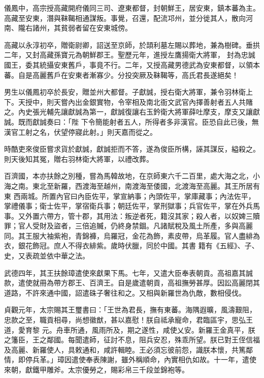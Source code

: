 \begin{pinyinscope}
 儀鳳中，高宗授高藏開府儀同三司、遼東都督，封朝鮮王，居安東，鎮本蕃為主。高藏至安東，潛與靺鞨相通謀叛。事覺，召還，配流邛州，並分徙其人，散向河南、隴右諸州，其貧弱者留在安東城傍。



 高藏以永淳初卒，贈衛尉卿，詔送至京師，於頡利墓左賜以葬地，兼為樹碑。垂拱二年，又封高藏孫寶元為朝鮮郡王。聖歷元年，進授左鷹揚衛大將軍，
 封為忠誠國王，委其統攝安東舊戶，事竟不行。二年，又授高藏男德武為安東都督，以領本蕃。自是高麗舊戶在安東者漸寡少。分投突厥及靺鞨等，高氏君長遂絕矣！



 男生以儀鳳初卒於長安，贈並州大都督。子獻誠，授右衛大將軍，兼令羽林衛上下。天授中，則天嘗內出金銀實物，令宰相及南北衙文武官內擇善射者五人共賭之。內史張光輔先讓獻誠為第一，獻誠復讓右玉鈐衛大將軍薛吐摩支，摩支又讓獻誠。既而獻誠奏曰：「陛
 下令簡能射者五人，所得者多非漢官。臣恐自此已後，無漢官工射之名，伏望停寢此射。」則天嘉而從之。



 時酷吏來俊臣嘗求貨於獻誠，獻誠拒而不答，遂為俊臣所構，誣其謀反，縊殺之。則天後知其冤，贈右羽林衛大將軍，以禮改葬。



 百濟國，本亦扶餘之別種，嘗為馬韓故地，在京師東六千二百里，處大海之北，小海之南。東北至新羅，西渡海至越州，南渡海至倭國，北渡海至高麗。其王所居有東
 西兩城。所置內官曰內臣佐平，掌宣納事；內頭佐平，掌庫藏事；內法佐平，掌禮儀事；衛士佐平，掌宿衛兵事；朝廷佐平，掌刑獄事；兵官佐平，掌在外兵馬事。又外置六帶方，管十郡，其用法：叛逆者死，籍沒其家；殺人者，以奴婢三贖罪；官人受財及盜者，三倍追贓，仍終身禁錮。凡諸賦稅及風土所產，多與高麗同。其王服大袖紫袍，青錦褲，烏羅冠，金花為飾，素皮帶，烏革履。官人盡緋為衣，銀花飾冠。庶人不得衣緋紫。歲時伏臘，同於中國。其書
 籍有《五經》、子、史，又表疏並依中華之法。



 武德四年，其王扶餘璋遣使來獻果下馬。七年，又遣大臣奉表朝貢。高祖嘉其誠款，遣使就冊為帶方郡王、百濟王。自是歲遣朝貢，高祖撫勞甚厚。因訟高麗閉其道路，不許來通中國，詔遣硃子奢往和之。又相與新羅世為仇敵，數相侵伐。



 貞觀元年，太宗賜其王璽書曰：「王世為君長，撫有東蕃。海隅遐曠，風濤艱阻，忠款之至，職貢相尋，尚想徽猷，甚以嘉慰！朕自祗承寵命，君臨區宇，思弘王道，愛育黎
 元。舟車所通，風雨所及，期之遂性，咸使乂安。新羅王金真平，朕之籓臣，王之鄰國。每聞遣師，征討不息，阻兵安忍，殊乖所望。朕已對王侄信福及高麗、新羅使人，具敕通和，咸許輯睦。王必須忘彼前怨，識朕本懷，共篤鄰情，即停兵革。」璋因遣使奉表陳謝，雖外稱順命，內實相仇如故。十一年，遣使來朝，獻鐵甲雕斧。太宗優勞之，賜彩帛三千段並錦袍等。




\end{pinyinscope}
